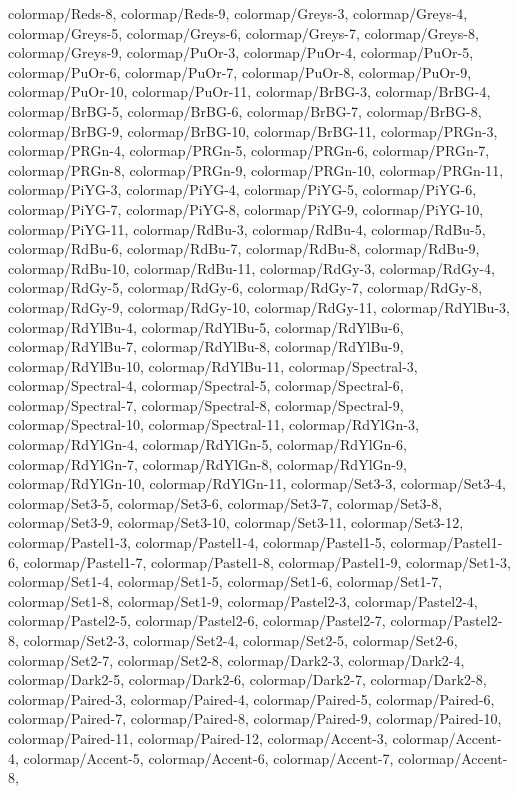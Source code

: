 {    colormap/Reds-8,
    colormap/Reds-9,
    colormap/Greys-3,
    colormap/Greys-4,
    colormap/Greys-5,
    colormap/Greys-6,
    colormap/Greys-7,
    colormap/Greys-8,
    colormap/Greys-9,
    colormap/PuOr-3,
    colormap/PuOr-4,
    colormap/PuOr-5,
    colormap/PuOr-6,
    colormap/PuOr-7,
    colormap/PuOr-8,
    colormap/PuOr-9,
    colormap/PuOr-10,
    colormap/PuOr-11,
    colormap/BrBG-3,
    colormap/BrBG-4,
    colormap/BrBG-5,
    colormap/BrBG-6,
    colormap/BrBG-7,
    colormap/BrBG-8,
    colormap/BrBG-9,
    colormap/BrBG-10,
    colormap/BrBG-11,
    colormap/PRGn-3,
    colormap/PRGn-4,
    colormap/PRGn-5,
    colormap/PRGn-6,
    colormap/PRGn-7,
    colormap/PRGn-8,
    colormap/PRGn-9,
    colormap/PRGn-10,
    colormap/PRGn-11,
    colormap/PiYG-3,
    colormap/PiYG-4,
    colormap/PiYG-5,
    colormap/PiYG-6,
    colormap/PiYG-7,
    colormap/PiYG-8,
    colormap/PiYG-9,
    colormap/PiYG-10,
    colormap/PiYG-11,
    colormap/RdBu-3,
    colormap/RdBu-4,
    colormap/RdBu-5,
    colormap/RdBu-6,
    colormap/RdBu-7,
    colormap/RdBu-8,
    colormap/RdBu-9,
    colormap/RdBu-10,
    colormap/RdBu-11,
    colormap/RdGy-3,
    colormap/RdGy-4,
    colormap/RdGy-5,
    colormap/RdGy-6,
    colormap/RdGy-7,
    colormap/RdGy-8,
    colormap/RdGy-9,
    colormap/RdGy-10,
    colormap/RdGy-11,
    colormap/RdYlBu-3,
    colormap/RdYlBu-4,
    colormap/RdYlBu-5,
    colormap/RdYlBu-6,
    colormap/RdYlBu-7,
    colormap/RdYlBu-8,
    colormap/RdYlBu-9,
    colormap/RdYlBu-10,
    colormap/RdYlBu-11,
    colormap/Spectral-3,
    colormap/Spectral-4,
    colormap/Spectral-5,
    colormap/Spectral-6,
    colormap/Spectral-7,
    colormap/Spectral-8,
    colormap/Spectral-9,
    colormap/Spectral-10,
    colormap/Spectral-11,
    colormap/RdYlGn-3,
    colormap/RdYlGn-4,
    colormap/RdYlGn-5,
    colormap/RdYlGn-6,
    colormap/RdYlGn-7,
    colormap/RdYlGn-8,
    colormap/RdYlGn-9,
    colormap/RdYlGn-10,
    colormap/RdYlGn-11,
    colormap/Set3-3,
    colormap/Set3-4,
    colormap/Set3-5,
    colormap/Set3-6,
    colormap/Set3-7,
    colormap/Set3-8,
    colormap/Set3-9,
    colormap/Set3-10,
    colormap/Set3-11,
    colormap/Set3-12,
    colormap/Pastel1-3,
    colormap/Pastel1-4,
    colormap/Pastel1-5,
    colormap/Pastel1-6,
    colormap/Pastel1-7,
    colormap/Pastel1-8,
    colormap/Pastel1-9,
    colormap/Set1-3,
    colormap/Set1-4,
    colormap/Set1-5,
    colormap/Set1-6,
    colormap/Set1-7,
    colormap/Set1-8,
    colormap/Set1-9,
    colormap/Pastel2-3,
    colormap/Pastel2-4,
    colormap/Pastel2-5,
    colormap/Pastel2-6,
    colormap/Pastel2-7,
    colormap/Pastel2-8,
    colormap/Set2-3,
    colormap/Set2-4,
    colormap/Set2-5,
    colormap/Set2-6,
    colormap/Set2-7,
    colormap/Set2-8,
    colormap/Dark2-3,
    colormap/Dark2-4,
    colormap/Dark2-5,
    colormap/Dark2-6,
    colormap/Dark2-7,
    colormap/Dark2-8,
    colormap/Paired-3,
    colormap/Paired-4,
    colormap/Paired-5,
    colormap/Paired-6,
    colormap/Paired-7,
    colormap/Paired-8,
    colormap/Paired-9,
    colormap/Paired-10,
    colormap/Paired-11,
    colormap/Paired-12,
    colormap/Accent-3,
    colormap/Accent-4,
    colormap/Accent-5,
    colormap/Accent-6,
    colormap/Accent-7,
    colormap/Accent-8,
}

